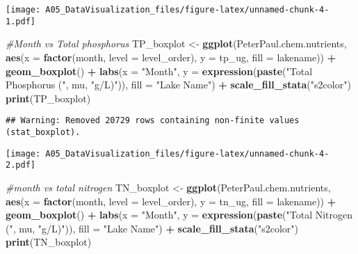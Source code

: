 \documentclass[]{article}
\newenvironment{Shaded}{\begin{snugshade}}{\end{snugshade}}
\newcommand{\CommentTok}[1]{\textcolor[rgb]{0.56,0.35,0.01}{\textit{#1}}}
\newcommand{\DataTypeTok}[1]{\textcolor[rgb]{0.13,0.29,0.53}{#1}}
\newcommand{\KeywordTok}[1]{\textcolor[rgb]{0.13,0.29,0.53}{\textbf{#1}}}
\newcommand{\NormalTok}[1]{#1}
\newcommand{\OperatorTok}[1]{\textcolor[rgb]{0.81,0.36,0.00}{\textbf{#1}}}
\newcommand{\StringTok}[1]{\textcolor[rgb]{0.31,0.60,0.02}{#1}}
\begin{document}
\texttt{[image: A05\_DataVisualization\_files/figure-latex/unnamed-chunk-4-1.pdf]}

\begin{Shaded}
\begin{Highlighting}[]
\CommentTok{#Month vs Total phosphorus }
\NormalTok{TP_boxplot <-}\StringTok{ }
\StringTok{  }\KeywordTok{ggplot}\NormalTok{(PeterPaul.chem.nutrients, }\KeywordTok{aes}\NormalTok{(}\DataTypeTok{x =} \KeywordTok{factor}\NormalTok{(month, }\DataTypeTok{level =}\NormalTok{ level_order), }
        \DataTypeTok{y =}\NormalTok{ tp_ug, }\DataTypeTok{fill =}\NormalTok{ lakename)) }\OperatorTok{+}
\StringTok{  }\KeywordTok{geom_boxplot}\NormalTok{() }\OperatorTok{+}
\StringTok{  }\KeywordTok{labs}\NormalTok{(}\DataTypeTok{x =} \StringTok{"Month"}\NormalTok{, }\DataTypeTok{y =} \KeywordTok{expression}\NormalTok{(}\KeywordTok{paste}\NormalTok{(}\StringTok{"Total Phosphorus ("}\NormalTok{, mu, }\StringTok{"g/L)"}\NormalTok{)), }
       \DataTypeTok{fill =} \StringTok{"Lake Name"}\NormalTok{) }\OperatorTok{+}
\StringTok{  }\KeywordTok{scale_fill_stata}\NormalTok{(}\StringTok{"s2color"}\NormalTok{) }
\KeywordTok{print}\NormalTok{(TP_boxplot)}
\end{Highlighting}
\end{Shaded}

\begin{verbatim}
## Warning: Removed 20729 rows containing non-finite values (stat_boxplot).
\end{verbatim}

\texttt{[image: A05\_DataVisualization\_files/figure-latex/unnamed-chunk-4-2.pdf]}

\begin{Shaded}
\begin{Highlighting}[]
\CommentTok{#month vs total nitrogen}
\NormalTok{TN_boxplot <-}\StringTok{ }
\StringTok{  }\KeywordTok{ggplot}\NormalTok{(PeterPaul.chem.nutrients, }\KeywordTok{aes}\NormalTok{(}\DataTypeTok{x =} \KeywordTok{factor}\NormalTok{(month, }\DataTypeTok{level =}\NormalTok{ level_order), }
                                       \DataTypeTok{y =}\NormalTok{ tn_ug, }\DataTypeTok{fill =}\NormalTok{ lakename)) }\OperatorTok{+}
\StringTok{  }\KeywordTok{geom_boxplot}\NormalTok{() }\OperatorTok{+}
\StringTok{  }\KeywordTok{labs}\NormalTok{(}\DataTypeTok{x =} \StringTok{"Month"}\NormalTok{, }\DataTypeTok{y =} \KeywordTok{expression}\NormalTok{(}\KeywordTok{paste}\NormalTok{(}\StringTok{"Total Nitrogen ("}\NormalTok{, mu, }\StringTok{"g/L)"}\NormalTok{)), }
       \DataTypeTok{fill =} \StringTok{"Lake Name"}\NormalTok{) }\OperatorTok{+}
\StringTok{  }\KeywordTok{scale_fill_stata}\NormalTok{(}\StringTok{"s2color"}\NormalTok{)}
\KeywordTok{print}\NormalTok{(TN_boxplot)}
\end{Highlighting}
\end{Shaded}
\end{document}
